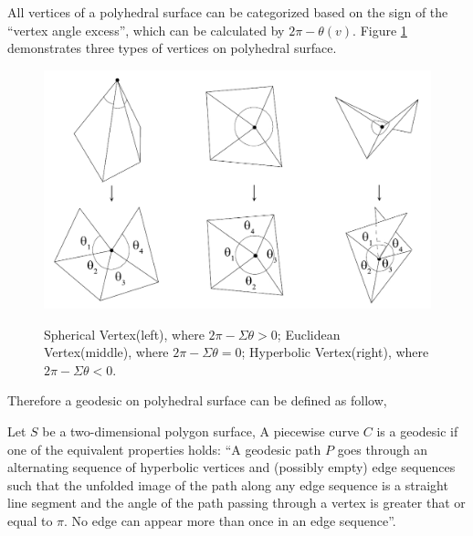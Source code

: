All vertices of a polyhedral surface can be categorized based on the sign of the ``vertex angle excess'', which can be calculated by $2\pi - \theta(v)$. Figure \ref{figure:geo_vertType} demonstrates three types of vertices on polyhedral surface.
\begin{figure}[H]
	\includegraphics[width=\columnwidth]{../images/vertex_type}\\[0.1cm]
    \caption[Classification of vertex on a polyhedral surface]{Spherical Vertex(left), where $2\pi - \Sigma\theta > 0$; Euclidean Vertex(middle), where $2\pi - \Sigma\theta = 0$; Hyperbolic Vertex(right), where $2\pi - \Sigma\theta < 0$.}
    \label{figure:geo_vertType}
\end{figure}

Therefore a geodesic on polyhedral surface can be defined as follow,

\begin{geodesic_def}
Let $S$ be a two-dimensional polygon surface, A piecewise curve $C$ is a geodesic if one of the equivalent properties holds:
``A geodesic path $P$ goes through an alternating sequence of hyperbolic vertices and (possibly empty) edge sequences such that the unfolded image of the path along any edge sequence is a straight line segment and the angle of the path passing through a vertex is greater that or equal to $\pi$. No edge can appear more than once in an edge sequence''.
\label{def:geodesic_def_poly}
\end{geodesic_def}

